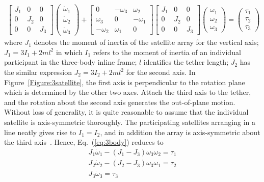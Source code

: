 \begin{align}
\begin{bmatrix}
J_1 &0  &0\\
0   &J_2&0\\
0   &0  &J_3
\end{bmatrix}\begin{pmatrix}
\dot{\omega}_1\\
\dot{\omega}_2\\
\dot{\omega}_3
\end{pmatrix}+\begin{bmatrix}
0   &-\omega_3  &\omega_2\\
\omega_3   &0   &-\omega_1\\
-\omega_2   &\omega_1  &0
\end{bmatrix}\begin{bmatrix}
J_1 &0  &0\\
0   &J_2&0\\
0   &0  &J_3
\end{bmatrix}\begin{pmatrix}
{\omega}_1\\
{\omega}_2\\
{\omega}_3
\end{pmatrix}=\begin{pmatrix}
\tau_1\\
\tau_2\\
\tau_3
\end{pmatrix}\label{eq:3body}
\end{align}
where $J_1$ denotes the moment of inertia of the satellite array for the vertical axis; $J_1=3I_1+2ml^2$ in which $I_1$ refers to the moment of inertia of an individual participant in the three-body inline frame; $l$ identifies the tether length; $J_2$ has the similar expression $J_2=3I_2+2ml^2$ for the second axis. In Figure~\ref{Figure:3satellite}, the first axis is perpendicular to the rotation plane which is determined by the other two axes. Attach the third axis to the tether, and the rotation about the second axis generates the out-of-plane motion. Without loss of generality, it is quite reasonable to assume that the individual satellite is axis-symmetric thoroughly. The participating satellites arranging in a line neatly gives rise to $I_1=I_2$, and in addition the array is axis-symmetric about the third axis~\cite{chung2008propellant1}. Hence, Eq.~(\ref{eq:3body}) reduces to
\begin{align}
J_1\dot{\omega}_1-(J_1-J_3)\omega_3\omega_2=\tau_1\label{eq:3model1}\\
J_2\dot{\omega}_2-(J_2-J_3)\omega_3\omega_1=\tau_2\label{eq:3model2}\\
J_3\dot{\omega}_3=\tau_3\label{eq:3model}
\end{align}
